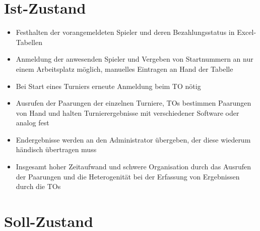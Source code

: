\documentclass[11pt]{article}
\begin{document}
\section{Ist-Zustand}

\begin{itemize}
	\item Festhalten der vorangemeldeten Spieler und deren Bezahlungsstatus in Excel-Tabellen
	\item Anmeldung der anwesenden Spieler und Vergeben von Startnummern an nur einem Arbeitsplatz möglich, manuelles Eintragen an Hand der Tabelle
	\item Bei Start eines Turniers erneute Anmeldung beim TO nötig
	\item Ausrufen der Paarungen der einzelnen Turniere, TOs bestimmen Paarungen von Hand und halten Turnierergebnisse mit verschiedener Software oder analog fest
	\item Endergebnisse werden an den Administrator übergeben, der diese wiederum händisch übertragen muss
	\item Insgesamt hoher Zeitaufwand und schwere Organisation durch das Ausrufen der Paarungen und die Heterogenität bei der Erfassung von Ergebnissen durch die TOs
\end{itemize}

\newpage
\section{Soll-Zustand}
\end{document}
